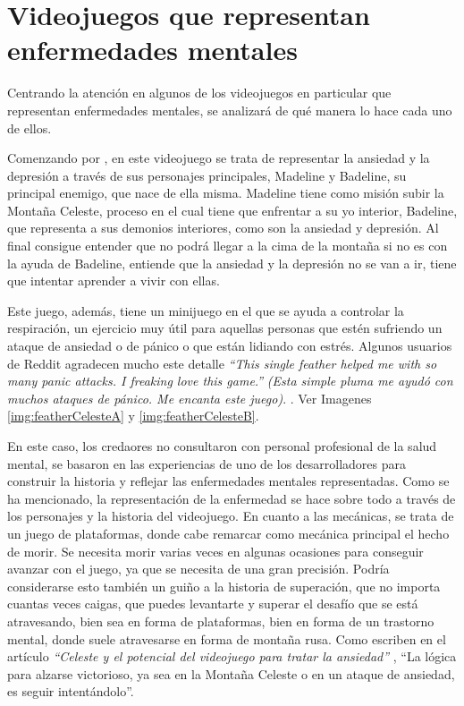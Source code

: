 \documentclass[12pt, a4paper,twoside,titlepage]{book}
\begin{document}
\section{Videojuegos que representan enfermedades mentales}
\label{sec:videojuegosEnf}

Centrando la atención en algunos de los videojuegos en particular que representan enfermedades mentales, se analizará de qué manera lo hace cada uno de ellos.

Comenzando por ,  en este videojuego se trata de representar la ansiedad y la depresión a través de sus personajes principales, Madeline y Badeline, su principal enemigo, que nace de ella misma. Madeline tiene como misión subir la Montaña Celeste, proceso en el cual tiene que enfrentar a su yo interior, Badeline, que representa a sus demonios interiores, como son la ansiedad y depresión. Al final consigue entender que no podrá llegar a la cima de la montaña si no es con la ayuda de Badeline, entiende que la ansiedad y la depresión no se van a ir, tiene que intentar aprender a vivir con ellas. 

Este juego, además, tiene un minijuego en el que se ayuda a controlar la respiración, un ejercicio muy útil para aquellas personas que estén sufriendo un ataque de ansiedad o de pánico o que están lidiando con estrés. Algunos usuarios de Reddit agradecen mucho este detalle \textit{``This single feather helped me with so many panic attacks. I freaking love this game.''} \textit{(Esta simple pluma me ayudó con muchos ataques de pánico. Me encanta este juego)}. \cite{featheceleste}. Ver Imagenes \ref{img:featherCelesteA} y \ref{img:featherCelesteB}.  

En este caso, los credaores no consultaron con personal profesional de la salud mental, se basaron en las experiencias de uno de los desarrolladores para construir la historia y reflejar las enfermedades mentales representadas. 
Como se ha mencionado, la representación de la enfermedad se hace sobre todo a través de los personajes y la historia del videojuego. En cuanto a las mecánicas, se trata de un juego de plataformas, donde cabe remarcar como mecánica principal el hecho de morir. Se necesita morir varias veces en algunas ocasiones para conseguir avanzar con el juego, ya que se necesita de una gran precisión. Podría considerarse esto también un guiño a la historia de superación, que no importa cuantas veces caigas, que puedes levantarte y superar el desafío que se está atravesando, bien sea en forma de plataformas, bien en forma de un trastorno mental, donde suele atravesarse en forma de montaña rusa. Como escriben en el artículo \textit{``Celeste y el potencial del videojuego para tratar la ansiedad''} \cite{articuloCeleste}, ``La lógica para alzarse victorioso, ya sea en la Montaña Celeste o en un ataque de ansiedad, es seguir intentándolo''. 
\end{document}
